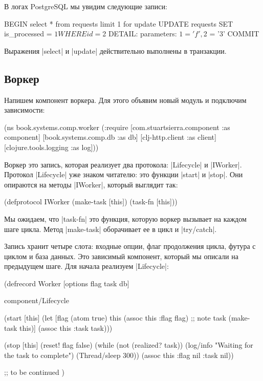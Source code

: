 В логах PostgreSQL мы увидим следующие записи:

\begin{code}
BEGIN
select * from requests limit 1 for update
UPDATE requests SET is_processed = $1 WHERE id = $2
DETAIL:  parameters: $1 = 'f', $2 = '3'
COMMIT
\end{code}

Выражения \spverb|select| и \spverb|update| действительно выполнены в транзакции.

\subsection{Воркер}

Напишем компонент воркера. Для этого объявим новый модуль и подключим
зависимости:

\begin{code}
(ns book.systems.comp.worker
  (:require
   [com.stuartsierra.component :as component]
   [book.systems.comp.db :as db]
   [clj-http.client :as client]
   [clojure.tools.logging :as log]))
\end{code}

Воркер это запись, которая реализует два протокола: \spverb|Lifecycle| и
\spverb|IWorker|. Протокол \spverb|Lifecycle| уже знаком читателю: это функции \spverb|start| и
\spverb|stop|. Они опираются на методы \spverb|IWorker|, который выглядит так:

\begin{code}
(defprotocol IWorker
  (make-task [this])
  (task-fn [this]))
\end{code}

Мы ожидаем, что \spverb|task-fn| это функция, которую воркер вызывает на каждом шаге
цикла. Метод \spverb|make-task| оборачивает ее в цикл и \spverb|try/catch|.

Запись хранит четыре слота: входные опции, флаг продолжения цикла, футура с
циклом и база данных. Это зависимый компонент, который мы описали на предыдущем
шаге. Для начала реализуем \spverb|Lifecycle|:

\begin{code}
(defrecord Worker
    [options flag task db]

  component/Lifecycle

  (start [this]
    (let [flag (atom true)
          this (assoc this :flag flag) ;; note
          task (make-task this)]
      (assoc this :task task)))

  (stop [this]
    (reset! flag false)
    (while (not (realized? task))
      (log/info "Waiting for the task to complete")
      (Thread/sleep 300))
    (assoc this :flag nil :task nil))

  ;; to be continued
  )
\end{code}

